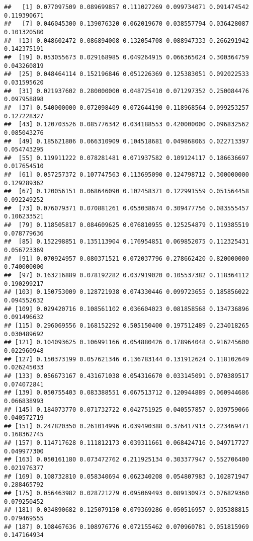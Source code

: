 \documentclass[
]{article}
\begin{document}
\begin{verbatim}
##   [1] 0.077097509 0.089699857 0.111027269 0.099734071 0.091474542 0.119390671
##   [7] 0.046045300 0.139076320 0.062019670 0.038557794 0.036428087 0.101320580
##  [13] 0.048602472 0.086894008 0.132054708 0.088947333 0.266291942 0.142375191
##  [19] 0.053055673 0.029168985 0.049264915 0.066365024 0.300364759 0.043260819
##  [25] 0.048464114 0.152196846 0.051226369 0.125383051 0.092022533 0.031595620
##  [31] 0.021937602 0.280000000 0.048725410 0.071297352 0.250084476 0.097958898
##  [37] 0.540000000 0.072098409 0.072644190 0.118968564 0.099253257 0.127228327
##  [43] 0.120703526 0.085776342 0.034188553 0.420000000 0.096832562 0.085043276
##  [49] 0.185621806 0.066310909 0.104518681 0.049868065 0.022713397 0.054743295
##  [55] 0.119911222 0.078281481 0.071937582 0.109124117 0.186636697 0.017654510
##  [61] 0.057257372 0.107747563 0.113695090 0.124798712 0.300000000 0.129289362
##  [67] 0.120056151 0.068646090 0.102458371 0.122991559 0.051564458 0.092249252
##  [73] 0.076079371 0.070881261 0.053038674 0.309477756 0.083555457 0.106233521
##  [79] 0.118505817 0.084609625 0.076810955 0.125254879 0.119385519 0.078779636
##  [85] 0.152298851 0.135113904 0.176954851 0.069852075 0.112325431 0.056723369
##  [91] 0.070924957 0.080371521 0.072037796 0.278662420 0.820000000 0.740000000
##  [97] 0.163216889 0.078192282 0.037919020 0.105537382 0.118364112 0.190299217
## [103] 0.150753009 0.128721938 0.074330446 0.099723655 0.185856022 0.094552632
## [109] 0.029420716 0.108561102 0.036604023 0.081858568 0.134736896 0.091496632
## [115] 0.296069556 0.168152292 0.505150400 0.197512489 0.234018265 0.030489692
## [121] 0.104093625 0.106991166 0.054880426 0.178964048 0.916245600 0.022960948
## [127] 0.150373199 0.057621346 0.136783144 0.131912624 0.118102649 0.026245033
## [133] 0.056673167 0.431671038 0.054316670 0.033145091 0.070389517 0.074072841
## [139] 0.050755403 0.083388551 0.067513712 0.120944889 0.060944686 0.066838993
## [145] 0.184073770 0.071732722 0.042751925 0.040557857 0.039759066 0.040572719
## [151] 0.247820350 0.261014996 0.039490388 0.376417913 0.223469471 0.168362745
## [157] 0.114717628 0.111812173 0.039311661 0.068424716 0.049717727 0.049977300
## [163] 0.050161180 0.073472762 0.211925134 0.303377947 0.552706400 0.021976377
## [169] 0.108732810 0.058340694 0.062340208 0.054807983 0.102871947 0.288465792
## [175] 0.056463982 0.028721279 0.095069493 0.089130973 0.076829360 0.079250452
## [181] 0.034890682 0.125079150 0.079369286 0.050516957 0.035388815 0.079469555
## [187] 0.108467636 0.108976776 0.072155462 0.070960781 0.051815969 0.147164934

\end{verbatim}
\end{document}
